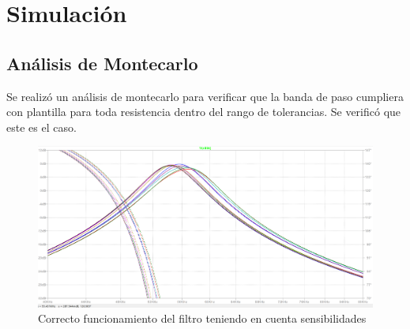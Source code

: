 \documentclass[../../tc_tp5_main.tex]{subfiles}
\begin{document}
 	 \section{Simulación}
	\subsection{Análisis de Montecarlo}
	Se realizó un análisis de montecarlo para verificar que la banda de paso cumpliera con plantilla para toda resistencia dentro del rango de tolerancias. Se verificó que este es el caso.\par
	 	 \begin{figure}[H]	%
	\centering
	\includegraphics[scale=0.5]{imagenes/montecarlo_ok.png}
	\caption{Correcto funcionamiento del filtro teniendo en cuenta sensibilidades}
	\label{fig:ej2_montecarlo_ok}
	\end{figure}
	
\end{document}
